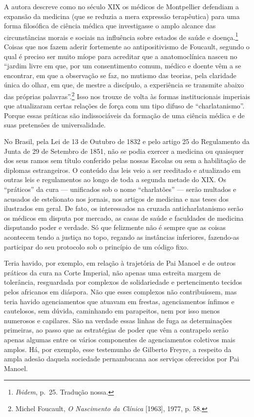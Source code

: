 A autora descreve como no século XIX os médicos de Montpellier defendiam
a expansão da medicina (que se reduzia a mera expressão terapêutica)
para uma forma filosófica de ciência médica que investigasse o amplo
alcance das circunstâncias morais e sociais na influência sobre estados
de saúde e doença.\footnote{\textit{Ibidem}, p.~25. Tradução nossa.}
Coisas que nos fazem aderir fortemente ao antipositivismo de Foucault,
segundo o qual é preciso ser muito míope para acreditar que a
anatomoclínica nasceu no ``jardim livre em que, por um consentimento
comum, médico e doente vêm a se encontrar, em que a observação se faz,
no mutismo das teorias, pela claridade única do olhar, em que, de mestre
a discípulo, a experiência se transmite abaixo das próprias
palavras''.\footnote{Michel Foucault, \textit{O Nascimento da Clínica}
  {[}1963{]}, 1977, p. 58.} Isso nos trouxe de volta às formas
institucionais imperiais que atualizaram certas relações de força com um
tipo difuso de ``charlatanismo''. Porque essas práticas são
indissociáveis da formação de uma ciência médica e de suas pretensões de
universalidade.

No Brasil, pela Lei de 13 de Outubro de 1832 e pelo artigo 25 do
Regulamento da Junta de 29 de Setembro de 1851, não se podia exercer a
medicina ou quaisquer dos seus ramos sem título conferido pelas nossas
Escolas ou sem a habilitação de diplomas estrangeiros. O conteúdo das
leis veio a ser reeditado e atualizado em outras leis e regulamentos ao
longo de toda a segunda metade do XIX. Os ``práticos'' da cura ---
unificados sob o nome ``charlatões'' --- serão multados e acusados de
estelionato nos jornais, nos artigos de medicina e nas teses dos
ilustrados em geral. De fato, os interessados na cruzada
anticharlatanismo serão os médicos em disputa por mercado, as casas de
saúde e faculdades de medicina disputando poder e verdade. Só que
felizmente não é sempre que as coisas acontecem tendo a justiça no topo,
regando as instâncias inferiores, fazendo-as participar do seu protocolo
sob o princípio de um código fixo.

Teria havido, por exemplo, em relação à trajetória de Pai Manoel e de
outros práticos da cura na Corte Imperial, não apenas uma estreita
margem de tolerância, resguardada por complexos de solidariedade e
pertencimento tecidos pelos africanos em diáspora. Não que esses
complexos não contribuíssem, mas teria havido agenciamentos que atuavam
em frestas, agenciamentos ínfimos e cautelosos, sem dúvida, caminhando
em parapeitos, nem por isso menos numerosos e capilares. São na verdade
essas linhas de fuga as determinações primeiras, ao passo que as
estratégias de poder que vêm a contrapelo serão apenas algumas entre os
vários componentes de agenciamentos coletivos mais amplos. Há, por
exemplo, esse testemunho de Gilberto Freyre, a respeito da ampla adesão
daquela sociedade pernambucana aos serviços oferecidos por Pai Manoel.

